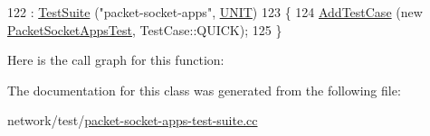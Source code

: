 \begin{DoxyCode}
122                                : \hyperlink{classns3_1_1TestSuite_a904b0c40583b744d30908aeb94636d1a}{TestSuite} (\textcolor{stringliteral}{"packet-socket-apps"}, \hyperlink{classns3_1_1TestSuite_a1ebfcab34ec8161e085e8e3a1855eae0a3885375a3787abf60431f8454b3cadbd}{UNIT})
123   \{
124     \hyperlink{classns3_1_1TestCase_a3718088e3eefd5d6454569d2e0ddd835}{AddTestCase} (\textcolor{keyword}{new} \hyperlink{classPacketSocketAppsTest}{PacketSocketAppsTest}, TestCase::QUICK);
125   \}
\end{DoxyCode}


Here is the call graph for this function\+:




The documentation for this class was generated from the following file\+:\begin{DoxyCompactItemize}
\item 
network/test/\hyperlink{packet-socket-apps-test-suite_8cc}{packet-\/socket-\/apps-\/test-\/suite.\+cc}\end{DoxyCompactItemize}
